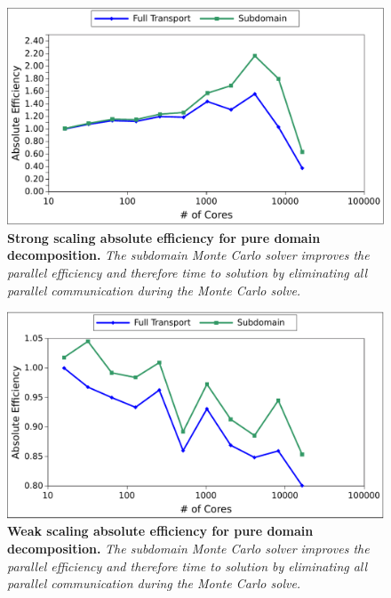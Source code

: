 \begin{figure}[t!]
  \begin{center}
    \includegraphics[width=6in]{chapters/parallel_mc/titan_strong_subdomain.pdf}
  \end{center}
  \caption{\textbf{Strong scaling absolute efficiency for pure domain
      decomposition.} \textit{The subdomain Monte Carlo solver
      improves the parallel efficiency and therefore time to solution
      by eliminating all parallel communication during the Monte Carlo
      solve.}}
  \label{fig:titan_strong_subdomain}
\end{figure}

\begin{figure}[t!]
  \begin{center}
    \includegraphics[width=6in]{chapters/parallel_mc/titan_weak_subdomain.pdf}
  \end{center}
  \caption{\textbf{Weak scaling absolute efficiency for pure domain
      decomposition.} \textit{The subdomain Monte Carlo solver
      improves the parallel efficiency and therefore time to solution
      by eliminating all parallel communication during the Monte Carlo
      solve.}}
  \label{fig:titan_weak_subdomain}
\end{figure}


